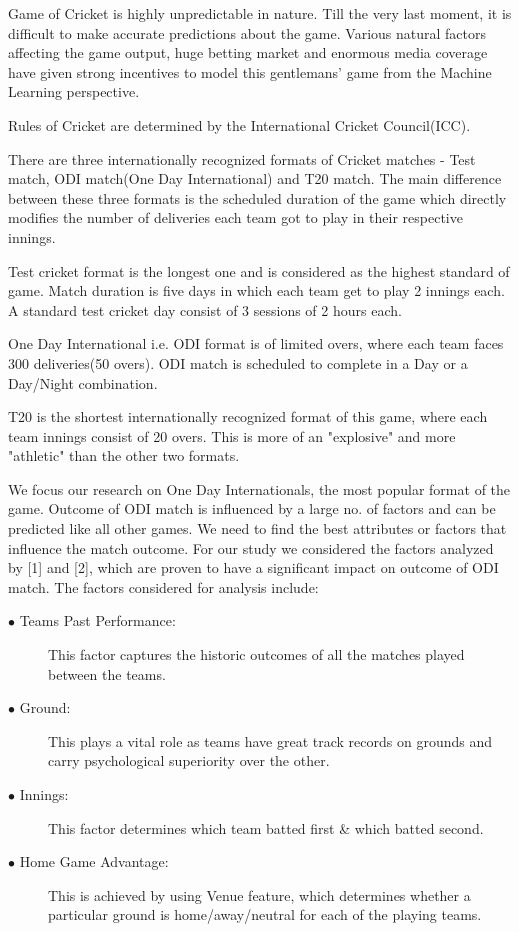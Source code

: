 \documentclass[a4paper, 10pt, conference]{IEEEtran}
\begin{document}
Game of Cricket is highly unpredictable in nature. Till the very last moment, it is difficult to make accurate predictions about the game. Various natural factors affecting the game output, huge betting market and enormous media coverage have given strong incentives to model this gentlemans' game from the Machine Learning perspective.

Rules of Cricket are determined by the International Cricket Council(ICC).

There are three internationally recognized formats of Cricket matches - Test match, ODI match(One Day International) and T20 match. The main difference between these three formats is the scheduled duration of the game which directly modifies the number of deliveries each team got to play in their respective innings.

Test cricket format is the longest one and is considered as the highest standard of game. Match duration is five days in which each team get to play 2 innings each. A standard test cricket day consist of 3 sessions of 2 hours each.

One Day International i.e. ODI format is of limited overs, where each team faces 300 deliveries(50 overs). ODI match is scheduled to complete in a Day or a Day/Night combination.

T20 is the shortest internationally recognized format of this game, where each team innings consist of 20 overs. This is more of an "explosive" and more "athletic" than the other two formats.

We focus our research on One Day Internationals, the most popular format of the game. Outcome of ODI match is influenced by a large no. of factors and  can be predicted like all other games. We need to find the best attributes or factors that influence the match outcome. For our study we considered the factors analyzed by [1] and [2], which are proven to have a significant impact on outcome of ODI match. The factors considered for analysis include:

\begin{description}
  \item[$\bullet$ Teams Past Performance:] This factor captures the historic outcomes of all the matches played between the teams.
  \item[$\bullet$ Ground:] This plays a vital role as teams have great track records on grounds and carry psychological superiority over the other.
  \item[$\bullet$ Innings:] This factor determines which team batted first \& which batted second.
  \item[$\bullet$ Home Game Advantage:] This is achieved by using Venue feature, which determines whether a particular ground is home/away/neutral for each of the playing teams.
\end{description}
\end{document}
